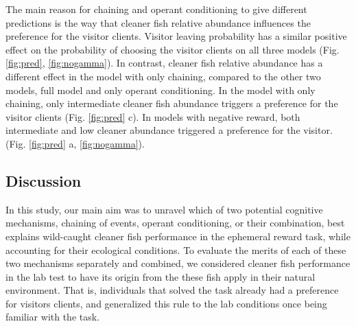 \documentclass[]{rsos}%
\begin{document}
The main reason for chaining and operant conditioning to give different
predictions is the way that cleaner fish relative abundance influences the
preference for the visitor clients. Visitor leaving probability has a
similar positive effect on the probability of choosing the visitor
clients on all three models (Fig. \ref{fig:pred}, \ref{fig:nogamma}). In
contrast, cleaner fish relative abundance has a different effect in the
model with only chaining, compared to the other two models,
full model and only operant conditioning. In the model
with only chaining, only intermediate cleaner fish abundance triggers a
preference for the visitor clients (Fig. \ref{fig:pred} c). In models
with negative reward, both intermediate and low cleaner abundance
triggered a preference for the visitor. (Fig. \ref{fig:pred} a,
\ref{fig:nogamma}).

\hypertarget{discussion}{%
\subsection{Discussion}\label{discussion}}

In this study, our main aim was to unravel which of two potential
cognitive mechanisms, chaining of events, operant conditioning,
or their combination, best explains wild-caught cleaner fish
performance in the ephemeral reward task, while accounting for their
ecological conditions. To evaluate the merits of each of these two mechanisms
separately and combined, we considered cleaner fish performance
in the lab test to have its origin from the these fish apply
in their natural environment. That is, individuals that
solved the task already had a preference for
visitors clients, and generalized this rule to the lab conditions
once being familiar with the task.
\end{document}
